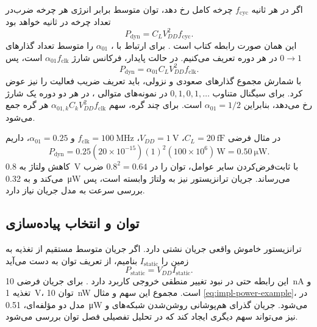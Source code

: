 اگر در هر ثانیه \(f_{\mathrm{cyc}}\) چرخه کامل رخ دهد، توان متوسط برابر انرژی
هر چرخه ضرب‌در تعداد چرخه در ثانیه خواهد بود
\begin{equation}
 P_{\mathrm{dyn}}=C_LV_{DD}^2f_{\mathrm{cyc}}.
 \label{eq:impl-dynamic-power}
\end{equation}
این همان صورت رابطه کتاب است \cite[صفحه ۴۳]{weste}. برای ارتباط با ،
\(\alpha_{01}\) را متوسط تعداد گذارهای \(0\rightarrow1\) در هر دوره 
تعریف می‌کنیم. در حالت پایدار، فرکانس شارژ \(\alpha_{01}f_{\mathrm{clk}}\) است، پس
\begin{equation}
 P_{\mathrm{dyn}}=\alpha_{01}C_LV_{DD}^2f_{\mathrm{clk}}.
 \label{eq:impl-activity-power}
\end{equation}
با شمارش مجموع گذارهای صعودی و نزولی، باید تعریف ضریب فعالیت را نیز عوض کرد.
برای سیگنال متناوب \(0,1,0,1,\ldots\) در نمونه‌های متوالی ، در هر دو
دوره یک شارژ رخ می‌دهد، بنابراین \(\alpha_{01}=1/2\) است. برای چند گره، سهم
\(\alpha_{01,k}C_kV_{DD}^2f_{\mathrm{clk}}\) هر گره جمع می‌شود.

در مثال فرضی \(C_L=\qty{20}{\femto\farad}\)، \(V_{DD}=\qty{1}{\volt}\)،
\(f_{\mathrm{clk}}=\qty{100}{\mega\hertz}\) و \(\alpha_{01}=0.25\)، داریم
\begin{equation}
 P_{\mathrm{dyn}}=0.25(20\times10^{-15})(1)^2(100\times10^6)
 \,\unit{\watt}=\qty{0.50}{\micro\watt}.
 \label{eq:impl-power-example}
\end{equation}
کاهش ولتاژ به \qty{0.8}{\volt} با ثابت‌فرض‌کردن سایر عوامل، توان را در
\(0.8^2=0.64\) ضرب می‌کند و به \qty{0.32}{\micro\watt} می‌رساند. جریان ترانزیستور
نیز به ولتاژ وابسته است، پس بررسی سرعت به مدل جریان نیاز دارد.

\subsection{توان  و انتخاب پیاده‌سازی}
ترانزیستور خاموش واقعی جریان نشتی دارد. اگر جریان متوسط مستقیم از تغذیه به زمین
را \(I_{\mathrm{static}}\) بنامیم، از تعریف توان به دست می‌آید
\begin{equation}
 P_{\mathrm{static}}=V_{DD}I_{\mathrm{static}}.
 \label{eq:impl-static-power}
\end{equation}
این رابطه حتی در نبود تغییر منطقی خروجی کاربرد دارد \cite[صفحه ۴۳]{weste}.
برای جریان فرضی \qty{10}{\nano\ampere} و تغذیه \qty{1}{\volt}، توان
\qty{10}{\nano\watt} است. مجموع این سهم و مثال \eqref{eq:impl-power-example}،
در مدل دو مؤلفه‌ای، \qty{0.51}{\micro\watt} می‌شود. جریان گذرای هم‌پوشانی روشن‌شدن
شبکه‌های  و  نیز می‌تواند سهم دیگری ایجاد کند که در تحلیل
تفصیلی فصل توان بررسی می‌شود.

